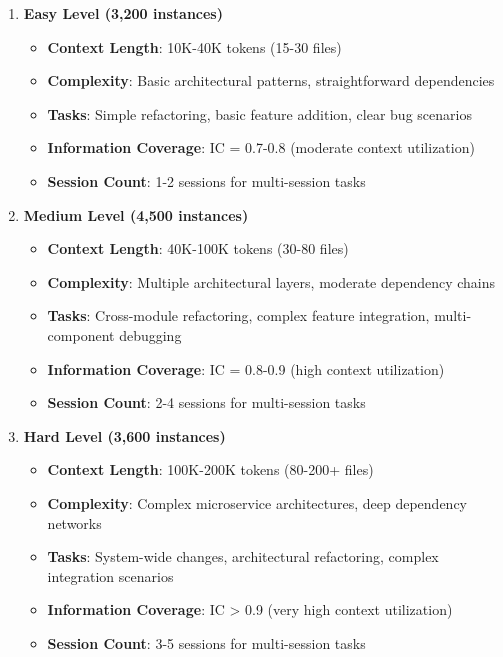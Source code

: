 \documentclass{article}
\begin{document}
\begin{enumerate}
    \item \textbf{Easy Level (3,200 instances)}
    \begin{itemize}
        \item \textbf{Context Length}: 10K-40K tokens (15-30 files)
        \item \textbf{Complexity}: Basic architectural patterns, straightforward dependencies
        \item \textbf{Tasks}: Simple refactoring, basic feature addition, clear bug scenarios
        \item \textbf{Information Coverage}: IC = 0.7-0.8 (moderate context utilization)
        \item \textbf{Session Count}: 1-2 sessions for multi-session tasks
    \end{itemize}
    
    \item \textbf{Medium Level (4,500 instances)}
    \begin{itemize}
        \item \textbf{Context Length}: 40K-100K tokens (30-80 files)
        \item \textbf{Complexity}: Multiple architectural layers, moderate dependency chains
        \item \textbf{Tasks}: Cross-module refactoring, complex feature integration, multi-component debugging
        \item \textbf{Information Coverage}: IC = 0.8-0.9 (high context utilization)
        \item \textbf{Session Count}: 2-4 sessions for multi-session tasks
    \end{itemize}
    
    \item \textbf{Hard Level (3,600 instances)}
    \begin{itemize}
        \item \textbf{Context Length}: 100K-200K tokens (80-200+ files)
        \item \textbf{Complexity}: Complex microservice architectures, deep dependency networks
        \item \textbf{Tasks}: System-wide changes, architectural refactoring, complex integration scenarios
        \item \textbf{Information Coverage}: IC > 0.9 (very high context utilization)
        \item \textbf{Session Count}: 3-5 sessions for multi-session tasks
    \end{itemize}
    

\end{enumerate}
\end{document}

